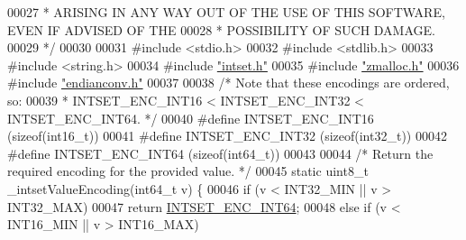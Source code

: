 \begin{DoxyCode}
00027 \textcolor{comment}{ * ARISING IN ANY WAY OUT OF THE USE OF THIS SOFTWARE, EVEN IF ADVISED OF THE}
00028 \textcolor{comment}{ * POSSIBILITY OF SUCH DAMAGE.}
00029 \textcolor{comment}{ */}
00030 
00031 \textcolor{preprocessor}{#}\textcolor{preprocessor}{include} \textcolor{preprocessor}{<}\textcolor{preprocessor}{stdio}\textcolor{preprocessor}{.}\textcolor{preprocessor}{h}\textcolor{preprocessor}{>}
00032 \textcolor{preprocessor}{#}\textcolor{preprocessor}{include} \textcolor{preprocessor}{<}\textcolor{preprocessor}{stdlib}\textcolor{preprocessor}{.}\textcolor{preprocessor}{h}\textcolor{preprocessor}{>}
00033 \textcolor{preprocessor}{#}\textcolor{preprocessor}{include} \textcolor{preprocessor}{<}\textcolor{preprocessor}{string}\textcolor{preprocessor}{.}\textcolor{preprocessor}{h}\textcolor{preprocessor}{>}
00034 \textcolor{preprocessor}{#}\textcolor{preprocessor}{include} \hyperlink{intset_8h}{"intset.h"}
00035 \textcolor{preprocessor}{#}\textcolor{preprocessor}{include} \hyperlink{zmalloc_8h}{"zmalloc.h"}
00036 \textcolor{preprocessor}{#}\textcolor{preprocessor}{include} \hyperlink{endianconv_8h}{"endianconv.h"}
00037 
00038 \textcolor{comment}{/* Note that these encodings are ordered, so:}
00039 \textcolor{comment}{ * INTSET\_ENC\_INT16 < INTSET\_ENC\_INT32 < INTSET\_ENC\_INT64. */}
00040 \textcolor{preprocessor}{#}\textcolor{preprocessor}{define} \textcolor{preprocessor}{INTSET\_ENC\_INT16} \textcolor{preprocessor}{(}\textcolor{keyword}{sizeof}\textcolor{preprocessor}{(}\textcolor{preprocessor}{int16\_t}\textcolor{preprocessor}{)}\textcolor{preprocessor}{)}
00041 \textcolor{preprocessor}{#}\textcolor{preprocessor}{define} \textcolor{preprocessor}{INTSET\_ENC\_INT32} \textcolor{preprocessor}{(}\textcolor{keyword}{sizeof}\textcolor{preprocessor}{(}\textcolor{preprocessor}{int32\_t}\textcolor{preprocessor}{)}\textcolor{preprocessor}{)}
00042 \textcolor{preprocessor}{#}\textcolor{preprocessor}{define} \textcolor{preprocessor}{INTSET\_ENC\_INT64} \textcolor{preprocessor}{(}\textcolor{keyword}{sizeof}\textcolor{preprocessor}{(}\textcolor{preprocessor}{int64\_t}\textcolor{preprocessor}{)}\textcolor{preprocessor}{)}
00043 
00044 \textcolor{comment}{/* Return the required encoding for the provided value. */}
00045 \textcolor{keyword}{static} uint8\_t \_intsetValueEncoding(int64\_t v) \{
00046     \textcolor{keywordflow}{if} (v < INT32\_MIN || v > INT32\_MAX)
00047         \textcolor{keywordflow}{return} \hyperlink{intset_8c_a813ff1fc109e585be5fef8f605101064}{INTSET\_ENC\_INT64};
00048     \textcolor{keywordflow}{else} \textcolor{keywordflow}{if} (v < INT16\_MIN || v > INT16\_MAX)

\end{DoxyCode}
